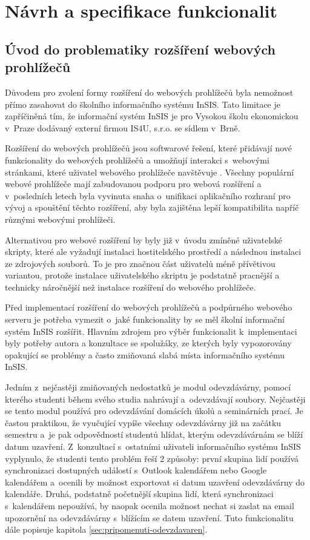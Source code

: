 \chapter{Návrh a specifikace funkcionalit}\label{chap:navrh-a-specifikace}

\section{Úvod do problematiky rozšíření webových prohlížečů}

Důvodem pro zvolení formy rozšíření do webových prohlížečů byla nemožnost přímo zasahovat do školního informačního systému InSIS. Tato limitace je zapříčiněná tím, že informační systém InSIS je  pro Vysokou školu ekonomickou v~Praze dodávaný externí firmou IS4U, s.r.o. se sídlem v~Brně. 

Rozšíření do webových prohlížečů jsou softwarové řešení, které přidávají nové funkcionality do webových prohlížečů a umožňují interakci s~webovými stránkami, které uživatel webového prohlížeče navštěvuje \cite{web_extensions_2019}. Všechny populární webové prohlížeče mají zabudovanou podporu pro webová rozšíření a v~posledních letech byla vyvinuta snaha o~unifikaci aplikačního rozhraní pro vývoj a spouštění těchto rozšíření, aby byla zajištěna lepší kompatibilita napříč různými webovými prohlížeči.  

Alternativou pro webové rozšíření by byly již v~úvodu zmíněné uživatelské skripty, které ale vyžadují instalaci hostitelského prostředí a následnou instalaci ze zdrojových souborů. To je pro značnou část uživatelů méně přívětivou variantou, protože instalace uživatelského skriptu je podstatně pracnější a technicky náročnější než instalace rozšíření do webového prohlížeče. 

Před implementací rozšíření do webových prohlížečů a podpůrného webového serveru je potřeba vymezit o~jaké funkcionality by se měl školní informační systém InSIS rozšířit. 
Hlavním zdrojem pro výběr funkcionalit k~implementaci byly potřeby autora a konzultace se spolužáky, ze kterých byly vypozorovány opakující se problémy a často zmiňovaná slabá místa informačního systému InSIS. 

Jedním z~nejčastěji zmiňovaných nedostatků je modul odevzdávárny, pomocí kterého studenti během svého studia nahrávají a~odevzdávají soubory. Nejčastěji se tento modul používá pro odevzdávání domácích úkolů a seminárních prací. Je častou praktikou, že vyučující vypíše všechny odevzdávárny již na začátku semestru a~je pak odpovědností studentů hlídat, kterým odevzdávárnám se blíží datum uzavření. Z~konzultací s~ostatními uživateli informačního systému InSIS vyplynulo, že studenti tento problém řeší 2 způsoby: první skupina lidí používá synchronizaci dostupných událostí s~Outlook kalendářem nebo Google kalendářem a~ocenili by možnost exportovat si datum uzavření odevzdávárny do kalendáře. Druhá, podstatně početnější skupina lidí, která synchronizaci s~kalendářem nepoužívá, by naopak ocenila možnost nechat si zaslat na email upozornění na odevzdávárny s~blížícím se datem uzavření. Tuto funkcionalitu dále popisuje kapitola \ref{sec:pripomenuti-odevzdavaren}.

